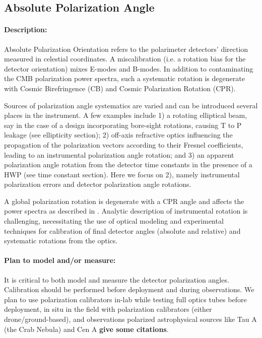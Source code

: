 \subsection{Absolute Polarization Angle}

\paragraph{Description:}
Absolute Polarization Orientation refers to the polarimeter detectors'
direction measured in celestial coordinates. A miscalibration (i.e. a rotation
bias for the detector orientation) mixes E-modes and B-modes. In addition to
contaminating the CMB polarization power spectra, such a systematic rotation is
degenerate with Cosmic Birefringence (CB) and Cosmic Polarization Rotation
(CPR).

Sources of polarization angle systematics are varied and can be introduced
several places in the instrument. A few examples include 1) a rotating
elliptical beam, say in the case of a design incorporating bore-sight
rotations, causing T to P leakage (see ellipticity section); 2) off-axis
refractive optics influencing the propagation of the polarization vectors
according to their Fresnel coefficients, leading to an instrumental
polarization angle rotation; and 3) an apparent polarization angle rotation
from the detector time constants in the presence of a HWP (see time constant
section). Here we focus on 2), namely instrumental polarization errors and
detector polarization angle rotations.

A global polarization rotation is degenerate with a CPR angle and affects the
power spectra as described in \cite{2013ApJ...762L..23K}. Analytic description
of instrumental rotation is challenging, necessitating the use of optical
modeling and experimental techniques for calibration of final detector angles
(absolute and relative) and systematic rotations from the optics.

\paragraph{Plan to model and/or measure:}
It is critical to both model and measure the detector polarization angles.
Calibration should be performed before deployment and during observations. 
We plan to use polarization calibrators in-lab while testing full optics tubes
before deployment, in situ in the field with polarization calibrators (either
drone/ground-based), and observations polarized astrophysical sources like Tau
A (the Crab Nebula) and Cen A \textbf{give some citations}.

